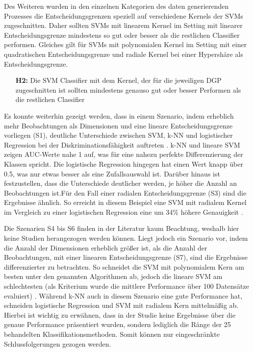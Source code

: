 \documentclass[
]{article}
\begin{document}
Des Weiteren wurden in den einzelnen Kategorien des daten generierenden
Prozesses die Entscheidungsgrenzen speziell auf verschiedene Kernels der
SVMs zugeschnitten. Daher sollten SVMs mit linearem Kernel im Setting
mit linearer Entscheidungsgrenze mindestens so gut oder besser als die
restlichen Classifier performen. Gleiches gilt für SVMs mit polynomialen
Kernel im Setting mit einer quadratischen Entscheidungsgrenze und
radiale Kernel bei einer Hypershäre als Entscheidungsgrenze.

\begin{minipage}{0.9\linewidth}
\begin{itemize}[leftmargin=0.1\linewidth]
\item[\textbf{H2:}] Die SVM Classifier mit dem Kernel, der für die jeweiligen DGP zugeschnitten ist sollten mindestens genauso gut oder besser Performen als die restlichen Classifier
\end{itemize}
\end{minipage}

Es konnte weiterhin gezeigt werden, dass in einem Szenario, indem
erheblich mehr Beobachtungen als Dimensionen und eine lineare
Entscheidungsgrenze vorliegen (S1), deutliche Unterschiede zwischen SVM,
k-NN und logistischer Regression bei der Diskriminationsfähigkeit
auftreten
\parencite{entezari-malekiComparisonClassificationMethods2009}. k-NN und
lineare SVM zeigen AUC-Werte nahe 1 auf, was für eine nahezu perfekte
Differenzierung der Klassen spricht. Die logistische Regression hingegen
hat einen Wert knapp über 0.5, was nur etwas besser als eine
Zufallsauswahl ist. Darüber hinaus ist festzustellen, dass die
Unterschiede deutlicher werden, je höher die Anzahl an Beobachtungen
ist.\newline Für den Fall einer radialen Entscheidungsgrenze (S3) sind
die Ergebnisse ähnlich. So erreicht in diesem Beispiel eine SVM mit
radialem Kernel im Vergleich zu einer logistischen Regression eine um
34\% höhere Genauigkeit
\parencite{faveroClassificationPerformanceEvaluation2022}.

Die Szenarien S4 bis S6 finden in der Literatur kaum Beachtung, weshalb
hier keine Studien herangezogen werden können. Liegt jedoch ein Szenario
vor, indem die Anzahl der Dimensionen erheblich größer ist, als die
Anzahl der Beobachtungen, mit einer linearen Entscheidungsgrenze (S7),
sind die Ergebnisse differenzierter zu betrachten. So schneidet die SVM
mit polynomialem Kern am besten unter den genannten Algorithmen ab,
jedoch die lineare SVM am schlechtesten (als Kriterium wurde die
mittlere Performance über 100 Datensätze evaluiert)
\parencite{scholzComparisonClassificationMethods2021}. Während k-NN auch
in diesem Szenario eine gute Performance hat, schneiden logistische
Regression und SVM mit radialem Kern mittelmäßig ab. Hierbei ist wichtig
zu erwähnen, dass in der Studie keine Ergebnisse über die genaue
Performance präsentiert wurden, sondern lediglich die Ränge der 25
behandelten Klassifikationsmethoden. Somit können nur eingeschränkte
Schlussfolgerungen gezogen werden.
\end{document}
